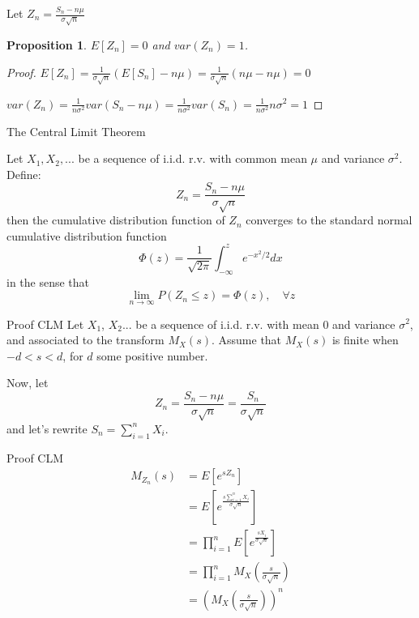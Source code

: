 \documentclass[aspectratio=169]{beamer}
\newtheorem{proposition}{Proposition}[section]
\begin{document}
\begin{frame}
    Let $Z_n=\frac{S_n-n\mu}{\sigma\sqrt{n}}$
    \begin{proposition}
        $E[Z_n]=0$ and $var(Z_n)=1$.
    \end{proposition}
    \begin{proof}
        $E[Z_n]=\frac{1}{\sigma\sqrt{n}}(E[S_n]-n\mu)=\frac{1}{\sigma\sqrt{n}}(n\mu-n\mu)=0$
        
        $var(Z_n)=\frac{1}{n\sigma^2}var(S_n-n\mu)=\frac{1}{n\sigma^2}var(S_n)=\frac{1}{n\sigma^2}n\sigma^2=1$
    \end{proof}
\end{frame}

\begin{frame}{The Central Limit Theorem}
    \begin{theorem}
        Let $X_1,X_2,...$ be a sequence of i.i.d. r.v. with common mean $\mu$ and variance $\sigma^2$. Define: $$Z_n=\frac{S_n-n\mu}{\sigma\sqrt{n}}$$ then the cumulative distribution function of $Z_n$ converges to the standard normal cumulative distribution function $$\Phi(z)=\frac{1}{\sqrt{2\pi}}\int_{-\infty}^{z}e^{-x^2/2}dx$$ in the sense that $$\lim_{n\rightarrow\infty}P(Z_n\leq z)=\Phi(z),\quad \forall z$$
    \end{theorem}
\end{frame}

\begin{frame}{Proof CLM}
    Let $X_1$, $X_2$... be a sequence of i.i.d. r.v. with mean $0$ and variance $\sigma^2$, and associated to the transform $M_X(s)$. Assume that $M_X(s)$ is finite when $-d<s<d$, for $d$ some positive number.

    Now, let $$Z_n=\frac{S_n-n\mu}{\sigma\sqrt{n}}=\frac{S_n}{\sigma\sqrt{n}}$$
    and let's rewrite $S_n=\sum_{i=1}^n X_i$.
\end{frame}

\begin{frame}{Proof CLM}
    \begin{align*}
        M_{Z_n}(s) &= E\left[e^{sZ_n}\right]\\
                   &= E\left[e^{\frac{s\sum_{i=1}^n X_i}{\sigma\sqrt{n}}}\right]\\
                   &= \prod_{i=1}^n E\left[e^{\frac{sX_i}{\sigma\sqrt{n}}}\right]\\
                   &= \prod_{i=1}^n M_X\left(\frac{s}{\sigma\sqrt{n}}\right)\\
                   &= \left(M_X\left(\frac{s}{\sigma\sqrt{n}}\right)\right)^n
    \end{align*}
\end{frame}
\end{document}
